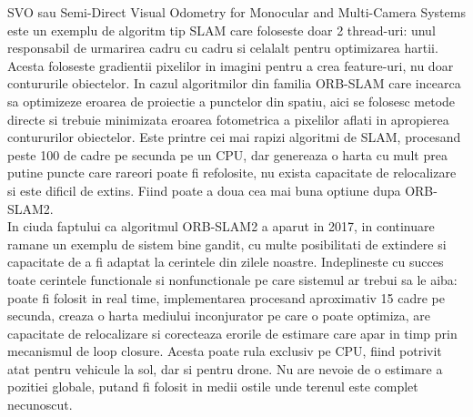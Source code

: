 \documentclass[12pt,a4paper]{report}
\begin{document}
SVO sau Semi-Direct Visual Odometry for Monocular and Multi-Camera Systems este un exemplu 
de algoritm tip SLAM care foloseste doar 2 thread-uri: unul responsabil de 
urmarirea cadru cu cadru si celalalt pentru optimizarea hartii. Acesta foloseste gradientii
pixelilor in imagini pentru a crea feature-uri, nu doar contururile obiectelor. In cazul
algoritmilor din familia ORB-SLAM care incearca sa optimizeze eroarea de proiectie a punctelor
din spatiu, aici se folosesc metode directe si trebuie minimizata eroarea fotometrica a 
pixelilor aflati in apropierea contururilor obiectelor. Este printre cei mai rapizi algoritmi
de SLAM, procesand peste 100 de cadre pe secunda pe un CPU, dar genereaza o harta cu mult 
prea putine puncte care rareori poate fi refolosite, nu exista capacitate de relocalizare si 
este dificil de extins. Fiind poate a doua cea mai buna optiune dupa ORB-SLAM2.\\

In ciuda faptului ca algoritmul ORB-SLAM2 a aparut in 2017, in continuare ramane
un exemplu de sistem bine gandit, cu multe posibilitati de extindere si capacitate de a fi 
adaptat la cerintele din zilele noastre. Indeplineste cu succes toate cerintele functionale 
si nonfunctionale pe care sistemul ar trebui sa le aiba: poate fi folosit in real time,
implementarea procesand aproximativ 15 cadre pe secunda, creaza o harta mediului inconjurator
pe care o poate optimiza, are capacitate de relocalizare si corecteaza erorile de estimare
care apar in timp prin mecanismul de loop closure. Acesta poate rula exclusiv pe CPU, fiind
potrivit atat pentru vehicule la sol, dar si pentru drone. Nu are nevoie de o estimare a pozitiei
globale, putand fi folosit in medii ostile unde terenul este complet necunoscut.  

\end{document}
